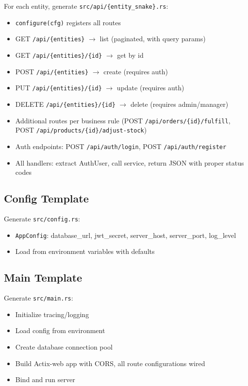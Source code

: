 \documentclass[11pt,a4paper]{article}
\begin{document}
For each entity, generate \texttt{src/api/\{entity\_snake\}.rs}:
\begin{itemize}
\item \texttt{configure(cfg)} registers all routes
\item GET \texttt{/api/\{entities\}} $\to$ list (paginated, with query params)
\item GET \texttt{/api/\{entities\}/\{id\}} $\to$ get by id
\item POST \texttt{/api/\{entities\}} $\to$ create (requires auth)
\item PUT \texttt{/api/\{entities\}/\{id\}} $\to$ update (requires auth)
\item DELETE \texttt{/api/\{entities\}/\{id\}} $\to$ delete (requires admin/manager)
\item Additional routes per business rule (POST \texttt{/api/orders/\{id\}/fulfill},
  POST \texttt{/api/products/\{id\}/adjust-stock})
\item Auth endpoints: POST \texttt{/api/auth/login}, POST \texttt{/api/auth/register}
\item All handlers: extract AuthUser, call service, return JSON with proper status codes
\end{itemize}

\subsection{Config Template}

Generate \texttt{src/config.rs}:
\begin{itemize}
\item \texttt{AppConfig}: database\_url, jwt\_secret, server\_host, server\_port,
  log\_level
\item Load from environment variables with defaults
\end{itemize}

\subsection{Main Template}

Generate \texttt{src/main.rs}:
\begin{itemize}
\item Initialize tracing/logging
\item Load config from environment
\item Create database connection pool
\item Build Actix-web app with CORS, all route configurations wired
\item Bind and run server
\end{itemize}
\end{document}
